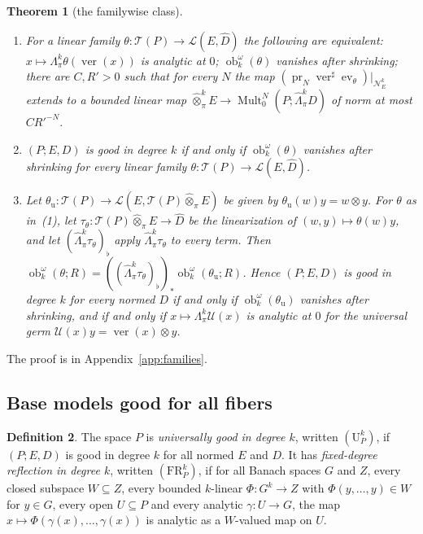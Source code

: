 \documentclass[11pt]{amsart}
\newtheorem{theorem}{Theorem}[section]
\theoremstyle{definition}
\newtheorem{definition}[theorem]{Definition}
\theoremstyle{remark}
\numberwithin{equation}{section}
\newcommand{\cL}{\mathcal L}
\newcommand{\Mult}{\operatorname{Mult}}
\theoremstyle{plain}
\theoremstyle{definition}
\theoremstyle{plain}
\newcommand{\ev}{\operatorname{ev}}
\newcommand{\ob}{\operatorname{ob}}
\newcommand{\hLambda}{\widehat\Lambda}
\newcommand{\cN}{\mathcal N}
\begin{document}
\begin{theorem}[the familywise class]\label{fam2:thm:class}
\begin{enumerate}
\item For a linear family $\theta\colon\mathcal T(P)\to\cL(E,\widehat D)$ the following are equivalent:
$x\mapsto\Lambda^k_\pi\theta(\operatorname{ver}(x))$ is analytic at $0$; $\ob^\omega_k(\theta)$ vanishes after shrinking;
there are $C,R'>0$ such that for every $N$ the map $(\operatorname{pr}_N\operatorname{ver}^\sharp\ev_\theta)|_{\cN^k_E}$
extends to a bounded linear map $\widehat\otimes^k_\pi E\to\Mult^N_0(P;\hLambda^k_\pi D)$ of norm at most $CR'^{-N}$.
\item $(P;E,D)$ is good in degree $k$ if and only if $\ob^\omega_k(\theta)$ vanishes after shrinking for every linear family
$\theta\colon\mathcal T(P)\to\cL(E,\widehat D)$.
\item Let $\theta_{\mathrm u}\colon\mathcal T(P)\to\cL(E,\mathcal T(P)\widehat\otimes_\pi E)$ be given by
$\theta_{\mathrm u}(w)y=w\otimes y$. For $\theta$ as in~(1), let $\tau_\theta\colon\mathcal T(P)\widehat\otimes_\pi E\to\widehat D$
be the linearization of $(w,y)\mapsto\theta(w)y$, and let $(\hLambda^k_\pi\tau_\theta)_\flat$ apply $\hLambda^k_\pi\tau_\theta$
to every term. Then $\ob^\omega_k(\theta;R)=((\hLambda^k_\pi\tau_\theta)_\flat)_*\ob^\omega_k(\theta_{\mathrm u};R)$. Hence
$(P;E,D)$ is good in degree $k$ for every normed $D$ if and only if $\ob^\omega_k(\theta_{\mathrm u})$ vanishes after
shrinking, and if and only if $x\mapsto\Lambda^k_\pi\mathcal U(x)$ is analytic at $0$ for the universal germ
$\mathcal U(x)y=\operatorname{ver}(x)\otimes y$.
\end{enumerate}
\end{theorem}

The proof is in Appendix~\ref{app:families}.

\subsection{Base models good for all fibers}\label{fam2:ssec:bases}

\begin{definition}\label{fam2:def:reflection}
The space $P$ is \emph{universally good in degree $k$}, written $(\mathrm U^k_P)$, if $(P;E,D)$ is good in degree $k$ for
all normed $E$ and $D$. It has \emph{fixed-degree reflection in degree $k$}, written $(\mathrm{FR}^k_P)$, if for all Banach
spaces $G$ and $Z$, every closed subspace $W\subseteq Z$, every bounded $k$-linear $\Phi\colon G^k\to Z$ with
$\Phi(y,\dots,y)\in W$ for $y\in G$, every open $U\subseteq P$ and every analytic $\gamma\colon U\to G$, the map
$x\mapsto\Phi(\gamma(x),\dots,\gamma(x))$ is analytic as a $W$-valued map on $U$.
\end{definition}
\end{document}
